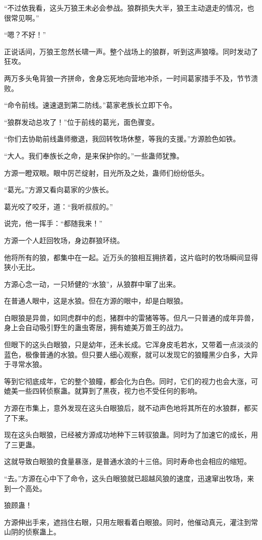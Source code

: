 \begin{this_body}
“不过依我看，这头万狼王未必会参战。狼群损失大半，狼王主动退走的情况，也很常见啊。”

“嗯？不好！”

正说话间，万狼王忽然长啸一声。整个战场上的狼群，听到这声狼嚎。同时发动了狂攻。

两万多头龟背狼一齐拼命，舍身忘死地向营地冲杀，一时间葛家措手不及，节节溃败。

“命令前线。速速退到第二防线。”葛家老族长立即下令。

“狼群发动总攻了！”位于前线的葛光，面色骤变。

“你们去协助前线蛊师撤退，我回转牧场休整，等我的支援。”方源脸色如铁。

“大人。我们奉族长之命，是来保护你的。”一些蛊师犹豫。

方源一瞪双眼。眼中厉芒绽射，目光所及之处，蛊师们纷纷低头。

“葛光。”方源又看向葛家的少族长。

葛光咬了咬牙，道：“我听叔叔的。”

说完，他一挥手：“都随我来！”

方源一个人赶回牧场，身边群狼环绕。

他将所有的狼，都集中在一起。近万头的狼相互拥挤着，这片临时的牧场瞬间显得狭小无比。

方源心念一动，一只矫健的“水狼”，从狼群中窜了出来。

在普通人眼中，这是水狼。但在方源的眼中，却是白眼狼。

白眼狼是异兽，如同虎群中的彪，猪群中的雷猪等等。但凡一只普通的成年异兽，身上会自动吸引野生的蛊虫寄居，拥有媲美万兽王的战力。

但眼下的这头白眼狼，只是幼年，还未长成。它浑身皮毛若水，又带着一点淡淡的蓝色，极像普通的水狼。但只要人细心观察，就可以发现它的狼瞳黑少白多，大异于寻常水狼。

等到它彻底成年，它的整个狼瞳，都会化为白色。同时，它们的视力也会大涨，可媲美一些四转侦察蛊。就算到了黑夜，视力也不受任何的影响。

方源在市集上，意外发现在这头白眼狼后，就不动声色地将其所在的水狼群，都买了下来。

现在这头白眼狼，已经被方源成功地种下三转驭狼蛊。同时为了加速它的成长，用了三更蛊。

这就导致白眼狼的食量暴涨，是普通水浪的十三倍。同时寿命也会相应的缩短。

“去。”方源在心中下了命令，这头白眼狼就已超越风狼的速度，迅速窜出牧场，来到一个高处。

狼顾蛊！

方源伸出手来，遮挡住右眼，只用左眼看着白眼狼。同时，他催动真元，灌注到常山阴的侦察蛊上。


\end{this_body}
